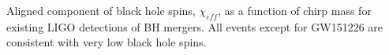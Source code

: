  \label{fig:BHspin} Aligned component of black hole spins, $\chi_{eff}$, as a function of chirp mass for existing LIGO detections of BH mergers. All events except for GW151226 are consistent with very low black hole spins.
